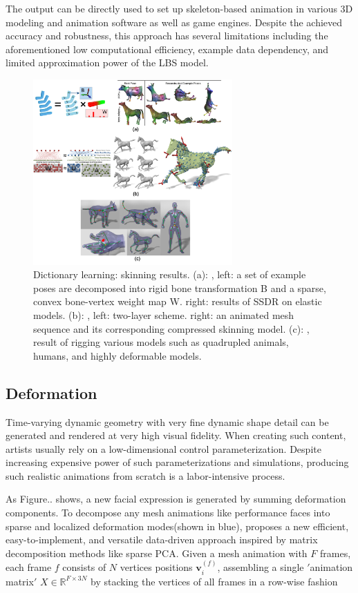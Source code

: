 The output can be directly used to set up skeleton-based animation in various 3D modeling and animation software as well as game engines. Despite the achieved accuracy and robustness, this approach has several limitations including the aforementioned low computational efficiency, example data dependency, and limited approximation power of the LBS model.


\begin{figure}[ht]
  \centering
  \includegraphics[width=3in]{images/skinning_decomposition}
  \caption{Dictionary learning: skinning results. (a): \cite{le2012smooth}, left: a set of example poses are decomposed into rigid bone transformation B and a sparse, convex bone-vertex weight map W. right: results of SSDR on elastic models. (b): \cite{le2013two}, left: two-layer scheme. right: an animated mesh sequence and its corresponding compressed skinning model. (c): \cite{le2014ras}, result of rigging various models such as quadrupled animals, humans, and highly deformable models.}
  \label{fig:skinning}
\end{figure}


\subsection{Deformation}
\label{subsec:deformation}


Time-varying dynamic geometry with very fine dynamic shape detail can be generated and rendered at very high visual fidelity.
When creating such content, artists usually rely on a low-dimensional control parameterization.
Despite increasing expensive power of such parameterizations and simulations, producing such realistic animations from scratch is a labor-intensive process.

As Figure.. shows, a new facial expression is generated by summing deformation components.
To decompose any mesh animations like performance faces into sparse and localized deformation modes(shown in blue),
\cite{neumann2013sparse} proposes a new efficient, easy-to-implement, and versatile data-driven approach inspired by matrix decomposition methods like sparse PCA\cite{zou2006sparse}.
Given a mesh animation with $F$ frames, each frame $f$ consists of $N$ vertices positions $\mathbf{v}{_{i}^{(f)}}$, assembling a single $'$animation matrix$'$ $X\in \mathbb{R}^{F\times 3N}$ by stacking the vertices of all frames in a row-wise fashion

